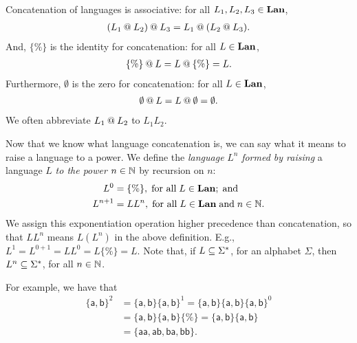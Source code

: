 Concatenation of languages is associative: for all $L_1,L_2,L_3\in\mathbf{Lan}$,
%
%
%
\begin{gather*}
(L_1\mathbin{@} L_2)\mathbin{@} L_3 = L_1\mathbin{@}(L_2\mathbin{@} L_3) .
\end{gather*}
And, $\{\%\}$ is the identity for concatenation:
%
%
%
for all $L\in\mathbf{Lan}$,
\begin{gather*}
{\{\%\}}\mathbin{@} L=L\mathbin{@}{\{\%\}}=L.
\end{gather*}
Furthermore, $\emptyset$ is the zero for concatenation:
%
%
%
for all $L\in\mathbf{Lan}$,
\begin{gather*}
\emptyset\mathbin{@} L=L\mathbin{@}\emptyset={\emptyset} .
\end{gather*}
We often abbreviate $L_1\mathbin{@} L_2$ to $L_1L_2$.

Now that we know what language concatenation is, we can say what it
means to raise a language to a power.  We define the \emph{language}
%
%
%
%
$L^n$ \emph{formed by raising} a language $L$ \emph{to the
  power} $n\in\mathbb{N}$
%
%
by recursion on $n$:
\begin{align*}
L^0      &= {\{\%\}} , \;\allowbreak\mbox{for all}\allowbreak\;L\in\mathbf{Lan} ; \;\allowbreak\mbox{and}\allowbreak\; \\
L^{n + 1} &= LL^n ,\;\allowbreak\mbox{for all}\allowbreak\;L\in\mathbf{Lan}\;\allowbreak\mbox{and}\allowbreak\;n\in\mathbb{N} .
\end{align*}
We assign this exponentiation operation higher precedence than
concatenation, so that $LL^n$ means $L(L^n)$ in the above definition.
E.g., $L^1 = L^{0+1} = LL^0 = L\{\%\} = L$.
Note that, if $L\subseteq\Sigma^*$, for an alphabet $\Sigma$, then
$L^n\subseteq\Sigma^*$, for all $n\in\mathbb{N}$.

For example, we have that
\begin{align*}
\mathsf{\{a,b\}}^2 &= 
\mathsf{\{a,b\}}\mathsf{\{a,b\}}^1 =
\mathsf{\{a,b\}}\mathsf{\{a,b\}}\mathsf{\{a,b\}}^0 \\
&=\mathsf{\{a,b\}}\mathsf{\{a,b\}}\{\%\} =
\mathsf{\{a,b\}}\mathsf{\{a,b\}} \\
&=\mathsf{\{aa, ab, ba, bb\}}.
\end{align*}

